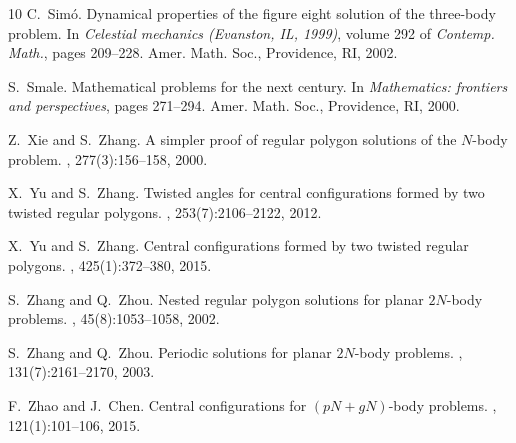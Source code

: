 \documentclass[final,11pt]{article}
\numberwithin{equation}{section}
\theoremstyle{definition}
\begin{document}
\begin{thebibliography}{10}
C.~Sim\'{o}.
\newblock Dynamical properties of the figure eight solution of the three-body
  problem.
\newblock In {\em Celestial mechanics ({E}vanston, {IL}, 1999)}, volume 292 of
  {\em Contemp. Math.}, pages 209--228. Amer. Math. Soc., Providence, RI, 2002.

S.~Smale.
\newblock Mathematical problems for the next century.
\newblock In {\em Mathematics: frontiers and perspectives}, pages 271--294.
  Amer. Math. Soc., Providence, RI, 2000.

Z.~Xie and S.~Zhang.
\newblock A simpler proof of regular polygon solutions of the {$N$}-body
  problem.
, 277(3):156--158, 2000.

X.~Yu and S.~Zhang.
\newblock Twisted angles for central configurations formed by two twisted
  regular polygons.
, 253(7):2106--2122, 2012.

X.~Yu and S.~Zhang.
\newblock Central configurations formed by two twisted regular polygons.
,
  425(1):372--380, 2015.

S.~Zhang and Q.~Zhou.
\newblock Nested regular polygon solutions for planar {$2N$}-body problems.
, 45(8):1053--1058, 2002.

S.~Zhang and Q.~Zhou.
\newblock Periodic solutions for planar {$2N$}-body problems.
, 131(7):2161--2170, 2003.

F.~Zhao and J.~Chen.
\newblock Central configurations for {$(pN+gN)$}-body problems.
, 121(1):101--106, 2015.
\end{thebibliography}





\normalsize
\end{document}
